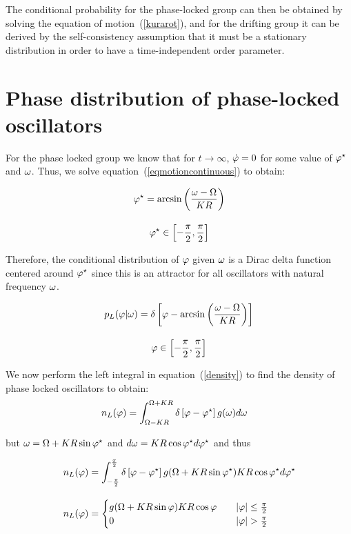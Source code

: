 The conditional probability for the phase-locked group can then be obtained by solving the equation of motion~(\ref{kurarot}), and for
the drifting group it can be derived by the self-consistency assumption that it must be a stationary distribution in order to have a
time-independent order parameter.

\section{Phase distribution of phase-locked oscillators}

For the phase locked group we know that for $t \to \infty$, $\dot{\varphi}=0$ for some value of $\varphi^\star$ and $\omega$. Thus,
we solve equation~(\ref{eqmotioncontinuous}) to obtain:

\begin{gather}
    \varphi^\star = \arcsin \left( \frac{\omega - \Omega}{K R} \right) \\[10pt]
    \varphi^\star \in \left[ -\frac{\pi}{2}, \frac{\pi}{2} \right] \notag
\end{gather}

Therefore, the conditional distribution of $\varphi$ given $\omega$ is a Dirac delta function centered around $\varphi^\star$ since
this is an attractor for all oscillators with natural frequency $\omega$.

\begin{gather}
    \label{lockedprob}
    p_L(\varphi | \omega) = \delta\left[ \varphi - \arcsin \left( \frac{\omega - \Omega}{K R} \right) \right] \\[10pt]
    \varphi \in \left[ -\frac{\pi}{2}, \frac{\pi}{2} \right] \notag
\end{gather}

We now perform the left integral in equation~(\ref{density}) to find the density of phase locked oscillators to obtain:
\begin{align*}
    n_L(\varphi) &= \int_{\Omega - K R}^{\Omega + K R} \delta\left[ \varphi - \varphi^\star \right] g(\omega) d\omega
\end{align*}

\noindent but $\omega = \Omega + K R \sin\varphi^\star$ and $d\omega = K R \cos \varphi^\star d\varphi^\star$ and thus

\begin{align}
    n_L(\varphi) &= \int_{-\frac{\pi}{2}}^{\frac{\pi}{2}} \delta \left[ \varphi - \varphi^\star \right] g(\Omega + K R \sin
    \varphi^\star) K R \cos \varphi^\star d\varphi^\star \notag\\[10pt]
    n_L(\varphi) &=
    \begin{cases}
        g(\Omega + K R \sin\varphi) K R \cos\varphi \quad &|\varphi| \leq \frac{\pi}{2}\\
        0 & |\varphi| > \frac{\pi}{2}
    \end{cases}
    \label{densitylocked}
\end{align}

